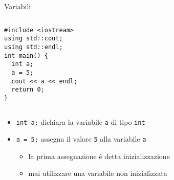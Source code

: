 \documentclass[xcolor=dvipsnames,handout]{beamer}
\begin{document}
\begin{frame}[fragile]{Variabili}
  \vfill
  \begin{columns}[c]
    \vfill
    \begin{lstlisting}
#include <iostream>
using std::cout;
using std::endl;
int main() {
  int a;
  a = 5;
  cout << a << endl;
  return 0;
}
    \end{lstlisting}
    \vfill
    \vfill
    \begin{center}\end{center}
    \vfill
  \end{columns}
  \vfill
  \begin{itemize}
    \item \lstinline$int a;$ \alert{dichiara} la variabile \lstinline$a$ di \alert{tipo} \lstinline$int$
    \vfill
    \item \lstinline$a = 5;$ \alert{assegna} il valore \lstinline$5$ alla variabile \lstinline$a$
    \begin{itemize}
      \item la prima assegnazione è detta \alert{inizializzazione}
      \item \alert{mai} utilizzare una variabile non inizializzata
    \end{itemize}
  \end{itemize}
  \vfill
\end{frame}
\end{document}
